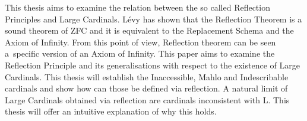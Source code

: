 \documentclass[12pt,a4paper]{article}
\begin{document}
\noindent This thesis aims to examine the relation between the so called Reflection Principles and Large Cardinals. Lévy has shown that the Reflection Theorem is a sound theorem of ZFC and it is equivalent to the Replacement Schema and the Axiom of Infinity. From this point of view, Reflection theorem can be seen a~specific version of an Axiom of Infinity. This paper aims to examine the Reflection Principle and its generalisations with respect to the existence of Large Cardinals. This thesis will establish the Inaccessible, Mahlo and Indescribable cardinals and show how can those be defined via reflection. A natural limit of Large Cardinals obtained via reflection are cardinals inconsistent with L. This thesis will offer an intuitive explanation of why this holds.
\end{document}
